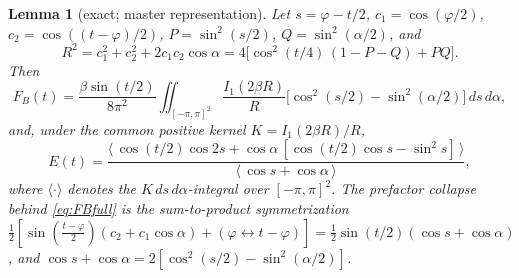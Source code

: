 \documentclass[11pt]{article}
\newtheorem{lemma}[theorem]{Lemma}
\theoremstyle{remark}
\newcommand{\FB}{F_{\!B}}
\newcommand{\dd}{\,d}
\begin{document}
\begin{lemma}[exact; master representation]\label{lem:master}
Let $s=\varphi-t/2$, $c_1=\cos(\varphi/2)$, $c_2=\cos((t-\varphi)/2)$,
$P=\sin^2(s/2)$, $Q=\sin^2(\alpha/2)$, and
\begin{equation}\label{eq:R2}
R^2=c_1^2+c_2^2+2c_1c_2\cos\alpha
   =4\bigl[\cos^2(t/4)\,(1-P-Q)+PQ\bigr] .
\end{equation}
Then
\begin{equation}\label{eq:FBfull}
\FB(t)=\frac{\beta\sin(t/2)}{8\pi^2}
\iint_{[-\pi,\pi]^2}\frac{I_1(2\beta R)}{R}
\bigl[\cos^2(s/2)-\sin^2(\alpha/2)\bigr]\dd s\dd\alpha,
\end{equation}
and, under the common positive kernel $K=I_1(2\beta R)/R$,
\begin{equation}\label{eq:masterE}
E(t)=\frac{\bigl\langle\,
\cos(t/2)\cos2s+\cos\alpha\,[\cos(t/2)\cos s-\sin^2 s]\,\bigr\rangle}
{\bigl\langle\,\cos s+\cos\alpha\,\bigr\rangle},
\end{equation}
where $\langle\cdot\rangle$ denotes the $K\dd s\dd\alpha$-integral over
$[-\pi,\pi]^2$. The prefactor collapse behind \eqref{eq:FBfull} is the
sum-to-product symmetrization
$\tfrac12[\sin(\tfrac{t-\varphi}{2})(c_2+c_1\cos\alpha)+(\varphi
\leftrightarrow t-\varphi)]=\tfrac12\sin(t/2)(\cos s+\cos\alpha)$, and
$\cos s+\cos\alpha=2[\cos^2(s/2)-\sin^2(\alpha/2)]$.
\end{lemma}
\end{document}
